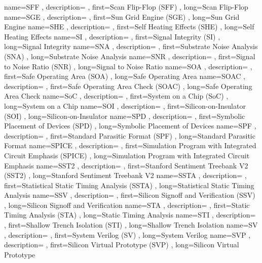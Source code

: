 { name={SFF}
, description={}
, first={Scan Flip-Flop (SFF)}
, long={Scan Flip-Flop}
}
{ name={SGE}
, description={}
, first={Sun Grid Engine (SGE)}
, long={Sun Grid Engine}
}
{ name={SHE}
, description={}
, first={Self Heating Effects (SHE)}
, long={Self Heating Effects}
}
{ name={SI}
, description={}
, first={Signal Integrity (SI)}
, long={Signal Integrity}
}
{ name={SNA}
, description={}
, first={Substrate Noise Analysis (SNA)}
, long={Substrate Noise Analysis}
}
{ name={SNR}
, description={}
, first={Signal to Noise Ratio (SNR)}
, long={Signal to Noise Ratio}
}
{ name={SOA}
, description={}
, first={Safe Operating Area (SOA)}
, long={Safe Operating Area}
}
{ name={SOAC}
, description={}
, first={Safe Operating Area Check (SOAC)}
, long={Safe Operating Area Check}
}
{ name={SoC}
, description={}
, first={System on a Chip (SoC)}
, long={System on a Chip}
}
{ name={SOI}
, description={}
, first={Silicon-on-Insulator (SOI)}
, long={Silicon-on-Insulator}
}
{ name={SPD}
, description={}
, first={Symbolic Placement of Devices (SPD)}
, long={Symbolic Placement of Devices}
}
{ name={SPF}
, description={}
, first={Standard Parasitic Format (SPF)}
, long={Standard Parasitic Format}
}
{ name={SPICE}
, description={}
, first={Simulation Program with Integrated Circuit Emphasis (SPICE)}
, long={Simulation Program with Integrated Circuit Emphasis}
}
{ name={SST2}
, description={}
, first={Stanford Sentiment Treebank V2 (SST2)}
, long={Stanford Sentiment Treebank V2}
}
{ name={SSTA}
, description={}
, first={Statistical Static Timing Analysis (SSTA)}
, long={Statistical Static Timing Analysis}
}
{ name={SSV}
, description={}
, first={Silicon Signoff and Verification (SSV)}
, long={Silicon Signoff and Verification}
}
{ name={STA}
, description={}
, first={Static Timing Analysis (STA)}
, long={Static Timing Analysis}
}
{ name={STI}
, description={}
, first={Shallow Trench Isolation (STI)}
, long={Shallow Trench Isolation}
}
{ name={SV}
, description={}
, first={System Verilog (SV)}
, long={System Verilog}
}
{ name={SVP}
, description={}
, first={Silicon Virtual Prototype (SVP)}
, long={Silicon Virtual Prototype}
}
